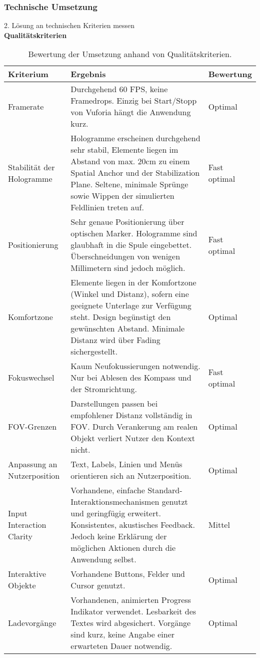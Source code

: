\subsubsection{Technische Umsetzung}
2. Lösung an technischen Kriterien messen\\
\textbf{Qualitätskriterien}
\bgroup
\setlength\extrarowheight{-2pt}
\def\arraystretch{2}
\begin{table}[htb]
	\centering
	\begin{tabular}{m{2.3cm}|m{6.5cm}|m{2cm}}
		Kriterium & Ergebnis & Bewertung\\
		\hline
		\hline
		Framerate & Durchgehend 60 FPS, keine Framedrops. Einzig bei Start/Stopp von Vuforia hängt die Anwendung kurz. & Optimal\\
		Stabilität der Hologramme & Hologramme erscheinen durchgehend sehr stabil, Elemente liegen im Abstand von max. 20cm zu einem Spatial Anchor und der Stabilization Plane. Seltene, minimale Sprünge sowie Wippen der simulierten Feldlinien treten auf. & Fast optimal\\
		Positionierung & Sehr genaue Positionierung über optischen Marker. Hologramme sind glaubhaft in die Spule eingebettet. Überschneidungen von wenigen Millimetern sind jedoch möglich. & Fast optimal\\
		Komfortzone & Elemente liegen in der Komfortzone (Winkel und Distanz), sofern eine geeignete Unterlage zur Verfügung steht. Design begünstigt den gewünschten Abstand. Minimale Distanz wird über Fading sichergestellt. & Optimal\\
		Fokuswechsel & Kaum Neufokussierungen notwendig. Nur bei Ablesen des Kompass und der Stromrichtung. & Fast optimal\\
		FOV-Grenzen & Darstellungen passen bei empfohlener Distanz vollständig in FOV. Durch Verankerung am realen Objekt verliert Nutzer den Kontext nicht. & Optimal\\
		Anpassung an Nutzerposition & Text, Labels, Linien und Menüs orientieren sich an Nutzerposition. & Optimal\\
		Input Interaction Clarity & Vorhandene, einfache Standard-Interaktionsmechanismen genutzt und geringfügig erweitert. Konsistentes, akustisches Feedback. Jedoch keine Erklärung der möglichen Aktionen durch die Anwendung selbst. & Mittel\\
		Interaktive Objekte & Vorhandene Buttons, Felder und Cursor genutzt. & Optimal\\
		Ladevorgänge  & Vorhandenen, animierten Progress Indikator verwendet. Lesbarkeit des Textes wird abgesichert. Vorgänge sind kurz, keine Angabe einer erwarteten Dauer notwendig. & Optimal\\
	\end{tabular}\caption{\label{tab:tech_results} Bewertung der Umsetzung anhand von Qualitätskriterien.}
\end{table}
\egroup

